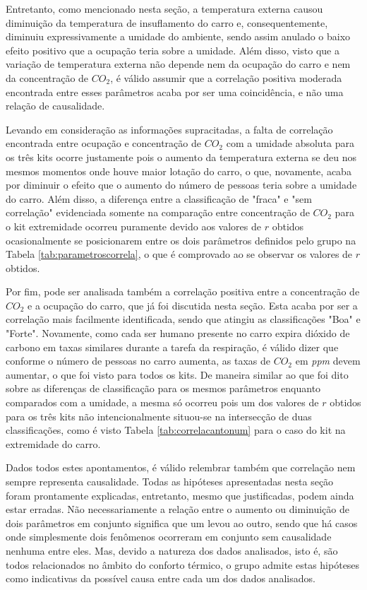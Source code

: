 \documentclass[acronym,symbols,table]{fei}
\begin{document}
Entretanto, como mencionado nesta seção, a temperatura externa causou diminuição da temperatura de insuflamento do carro e, consequentemente, diminuiu expressivamente a umidade do ambiente, sendo assim anulado o baixo efeito positivo que a ocupação teria sobre a umidade. Além disso, visto que a variação de temperatura externa não depende nem da ocupação do carro e nem da concentração de ${CO}_{2}$, é válido assumir que a correlação positiva moderada encontrada entre esses parâmetros acaba por ser uma coincidência, e não uma relação de causalidade. 

Levando em consideração as informações supracitadas, a falta de correlação encontrada entre ocupação e concentração de ${CO}_{2}$ com a umidade absoluta para os três kits ocorre justamente pois o aumento da temperatura externa se deu nos mesmos momentos onde houve maior lotação do carro, o que, novamente, acaba por diminuir o efeito que o aumento do número de pessoas teria sobre a umidade do carro. Além disso, a diferença entre a classificação de "fraca" e "sem correlação" evidenciada somente na comparação entre concentração de ${CO}_{2}$ para o kit extremidade ocorreu puramente devido aos valores de $r$ obtidos ocasionalmente se posicionarem entre os dois parâmetros definidos pelo grupo na Tabela \ref{tab:parametroscorrela}, o que é comprovado ao se observar os valores de $r$ obtidos.

Por fim, pode ser analisada também a correlação positiva entre a concentração de ${CO}_{2}$ e a ocupação do carro, que já foi discutida nesta seção. Esta acaba por ser a correlação mais facilmente identificada, sendo que atingiu as classificações "Boa" e "Forte". Novamente, como cada ser humano presente no carro expira dióxido de carbono em taxas similares durante a tarefa da respiração, é válido dizer que conforme o número de pessoas no carro aumenta, as taxas de ${CO}_{2}$ em \textit{ppm} devem aumentar, o que foi visto para todos os kits. De maneira similar ao que foi dito sobre as diferenças de classificação para os mesmos parâmetros enquanto comparados com a umidade, a mesma só ocorreu pois um dos valores de $r$ obtidos para os três kits não intencionalmente situou-se na intersecção de duas classificações, como é visto Tabela \ref{tab:correlacantonum} para o caso do kit na extremidade do carro.

Dados todos estes apontamentos, é válido relembrar também que correlação nem sempre representa causalidade. Todas as hipóteses apresentadas nesta seção foram prontamente explicadas, entretanto, mesmo que justificadas, podem ainda estar erradas. Não necessariamente a relação entre o aumento ou diminuição de dois parâmetros em conjunto significa que um levou ao outro, sendo que há casos onde simplesmente dois fenômenos ocorreram em conjunto sem causalidade nenhuma entre eles. Mas, devido a natureza dos dados analisados, isto é, são todos relacionados no âmbito do conforto térmico, o grupo admite estas hipóteses como indicativas da possível causa entre cada um dos dados analisados.
\end{document}
